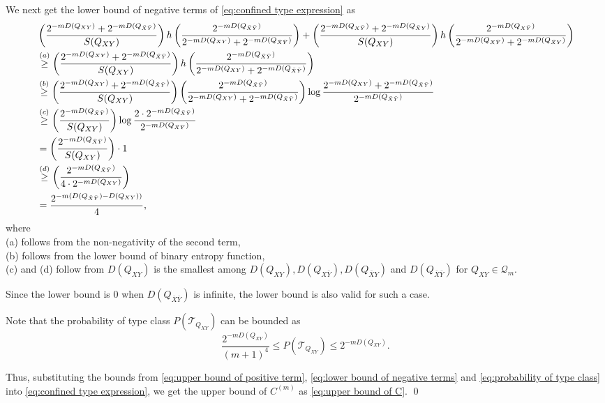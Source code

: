 \documentclass[journal,onecolumn]{IEEEtran}
\theoremstyle{definition}
\theoremstyle{remark}
\newcommand{\Dxy}{D({Q_{XY}})}
\newcommand{\Dxby}{D({Q_{X\bar{Y}}})}
\newcommand{\Dbxy}{D({Q_{\bar{X}Y}})}
\newcommand{\Dbxby}{D({Q_{\bar{X}\bar{Y}}})}
\newcommand{\Qxy}{Q_{XY}}
\begin{document}
    We next get the lower bound of negative terms of \eqref{eq:confined type expression} as
    \begin{align}
        &\left(\frac{2^{-m\Dxy}+2^{-m\Dbxby}}{S(\Qxy)}\right)h\left(\frac{2^{-m\Dbxby}}{2^{-m\Dxy}+2^{-m\Dbxby}}\right)+\left(\frac{2^{-m\Dxby}+2^{-m\Dbxy}}{S(\Qxy)}\right)h\left(\frac{2^{-m\Dxby}}{2^{-m\Dxby}+2^{-m\Dbxy}}\right)\notag\\
        & \overset{(a)}{\geq}\left(\frac{2^{-m\Dxy}+2^{-m\Dbxby}}{S(\Qxy)}\right)h\left(\frac{2^{-m\Dbxby}}{2^{-m\Dxy}+2^{-m\Dbxby}}\right) \notag\\
        &\overset{(b)}{\geq} \left(\frac{2^{-m\Dxy}+2^{-m\Dbxby}}{S(\Qxy)}\right) \left(\frac{2^{-m\Dbxby}}{2^{-m\Dxy}+2^{-m\Dbxby}}\right) \log \frac{2^{-m\Dxy}+2^{-m\Dbxby}}{2^{-m\Dbxby}}\notag\\
        &\overset{(c)}{\geq}\left(\frac{2^{-m\Dbxby}}{S(\Qxy)}\right) \log \frac{2\cdot 2^{-m\Dbxby}}{2^{-m\Dbxby}}\notag\\
        &= \left(\frac{2^{-m\Dbxby}}{S(\Qxy)}\right) \cdot 1\notag\\
        &\overset{(d)}{\geq} \left(\frac{2^{-m\Dbxby}}{4\cdot 2^{-m\Dxy}}\right) \notag\\
        &= \frac{2^{-m(\Dbxby-\Dxy)}}{4}, \label{eq:lower bound of negative terms}
    \end{align}
    where \\
    (a) follows from the non-negativity of the second term, \\
    (b) follows from the lower bound of binary entropy function, \\
    (c) and (d) follow from $\Dxy$ is the smallest among $\Dxy,\Dxby,\Dbxy$ and $\Dbxby$ for $\Qxy \in \mathcal{Q}_m$.

    Since the lower bound is 0 when $\Dbxby$ is infinite, the lower bound is also valid for such a case.

    Note that the probability of type class $P(\mathcal{T}_{\Qxy})$ can be bounded as \cite[Lemma 2.6]{Csiszár_Körner_2011}
    \begin{equation}\label{eq:probability of type class}
        \frac{2^{-m\Dxy} }{(m+1)^4}\leq P(\mathcal{T}_{\Qxy}) \leq 2^{-m\Dxy}.
    \end{equation}
    
    Thus, substituting the bounds from \eqref{eq:upper bound of positive term}, \eqref{eq:lower bound of negative terms} and \eqref{eq:probability of type class} into \eqref{eq:confined type expression}, we get the upper bound of $C^{(m)}$ as \eqref{eq:upper bound of C}.
    \qed
\end{document}
